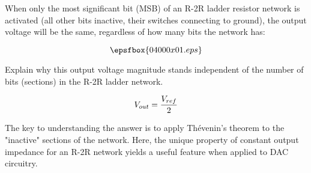 

When only the most significant bit (MSB) of an R-2R ladder resistor network is activated (all other bits inactive, their switches connecting to ground), the output voltage will be the same, regardless of how many bits the network has:

$$\epsfbox{04000x01.eps}$$

Explain why this output voltage magnitude stands independent of the number of bits (sections) in the R-2R ladder network.







$$V_{out} = {V_{ref} \over 2}$$







The key to understanding the answer is to apply Th\'evenin's theorem to the "inactive" sections of the network.  Here, the unique property of constant output impedance for an R-2R network yields a useful feature when applied to DAC circuitry.




